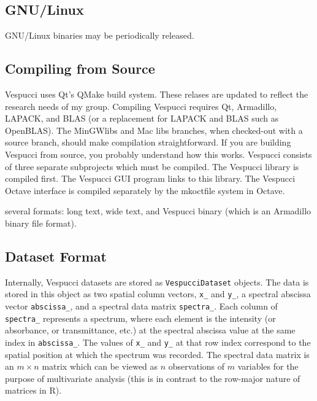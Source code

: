\documentclass[12pt]{achemso} %
\begin{document}
\subsection{GNU/Linux} GNU/Linux binaries may be periodically released.
\subsection{Compiling from Source} Vespucci uses Qt's QMake build system. These
relases are updated to reflect the research needs of my group. Compiling
Vespucci requires Qt, Armadillo, LAPACK, and BLAS (or a replacement for LAPACK
and BLAS such as OpenBLAS). The MinGW\textunderscore libs and Mac\textunderscore
libs branches, when checked-out with a source branch, should make compilation
straightforward. If you are building Vespucci from source, you probably
understand how this works. Vespucci consists of three separate subprojects which
must be compiled. The Vespucci library is compiled first. The Vespucci GUI
program links to this library. The Vespucci Octave interface is compiled
separately by the mkoctfile system in Octave.


several formats: long text, wide text, and Vespucci binary (which is an
Armadillo binary file format).

\subsection{Dataset Format} Internally, Vespucci datasets are stored as
\texttt{VespucciDataset} objects. The data is stored in this object as two
spatial column vectors, \texttt{x\_} and \texttt{y\_}, a spectral abscissa
vector \texttt{abscissa\_}, and a spectral data matrix \texttt{spectra\_}. Each
column of \texttt{spectra\_} represents a spectrum, where each element is the
intensity (or absorbance, or transmittance, etc.) at the spectral abscissa value
at the same index in \texttt{abscissa\_}. The values of \texttt{x\_} and
\texttt{y\_} at that row index correspond to the spatial position at which the
spectrum was recorded. The spectral data matrix is an \(m \times n\) matrix
which can be viewed as \(n\) observations of \(m\) variables for the purpose of
multivariate analysis (this is in contrast to the row-major nature of matrices
in R).
\end{document}

